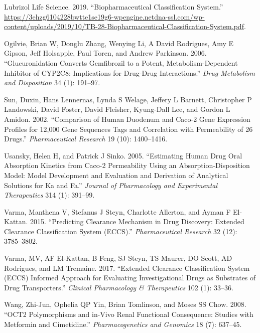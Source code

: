 \documentclass[
  11pt,
  krantz2, a4paper, twoside]{krantz}
\newlength{\cslhangindent}
\newlength{\cslentryspacingunit} %
\newenvironment{CSLReferences}[2] %
 {%
  \setlength{\parindent}{0pt}
  \ifodd #1
  \let\oldpar\par
  \def\par{\hangindent=\cslhangindent\oldpar}
  \fi
  \setlength{\parskip}{#2\cslentryspacingunit}
 }%
 {}
\begin{document}
\begin{CSLReferences}{1}{0}
\leavevmode{}%
Lubrizol Life Science. 2019. {``Biopharmaceutical Classification System.''} \url{https://3ehzg6104228bwtte1se19g6-wpengine.netdna-ssl.com/wp-content/uploads/2019/10/TB-28-Biopharmaceutical-Classification-System.pdf}.

\leavevmode{}%
Ogilvie, Brian W, Donglu Zhang, Wenying Li, A David Rodrigues, Amy E Gipson, Jeff Holsapple, Paul Toren, and Andrew Parkinson. 2006. {``Glucuronidation Converts Gemfibrozil to a Potent, Metabolism-Dependent Inhibitor of CYP2C8: Implications for Drug-Drug Interactions.''} \emph{Drug Metabolism and Disposition} 34 (1): 191--97.

\leavevmode{}%
Sun, Duxin, Hans Lennernas, Lynda S Welage, Jeffery L Barnett, Christopher P Landowski, David Foster, David Fleisher, Kyung-Dall Lee, and Gordon L Amidon. 2002. {``Comparison of Human Duodenum and Caco-2 Gene Expression Profiles for 12,000 Gene Sequences Tags and Correlation with Permeability of 26 Drugs.''} \emph{Pharmaceutical Research} 19 (10): 1400--1416.

\leavevmode{}%
Usansky, Helen H, and Patrick J Sinko. 2005. {``Estimating Human Drug Oral Absorption Kinetics from Caco-2 Permeability Using an Absorption-Disposition Model: Model Development and Evaluation and Derivation of Analytical Solutions for Ka and Fa.''} \emph{Journal of Pharmacology and Experimental Therapeutics} 314 (1): 391--99.

\leavevmode{}%
Varma, Manthena V, Stefanus J Steyn, Charlotte Allerton, and Ayman F El-Kattan. 2015. {``Predicting Clearance Mechanism in Drug Discovery: Extended Clearance Classification System (ECCS).''} \emph{Pharmaceutical Research} 32 (12): 3785--3802.

\leavevmode{}%
Varma, MV, AF El-Kattan, B Feng, SJ Steyn, TS Maurer, DO Scott, AD Rodrigues, and LM Tremaine. 2017. {``Extended Clearance Classification System (ECCS) Informed Approach for Evaluating Investigational Drugs as Substrates of Drug Transporters.''} \emph{Clinical Pharmacology \& Therapeutics} 102 (1): 33--36.

\leavevmode{}%
Wang, Zhi-Jun, Ophelia QP Yin, Brian Tomlinson, and Moses SS Chow. 2008. {``OCT2 Polymorphisms and in-Vivo Renal Functional Consequence: Studies with Metformin and Cimetidine.''} \emph{Pharmacogenetics and Genomics} 18 (7): 637--45.


\end{CSLReferences}
\end{document}
